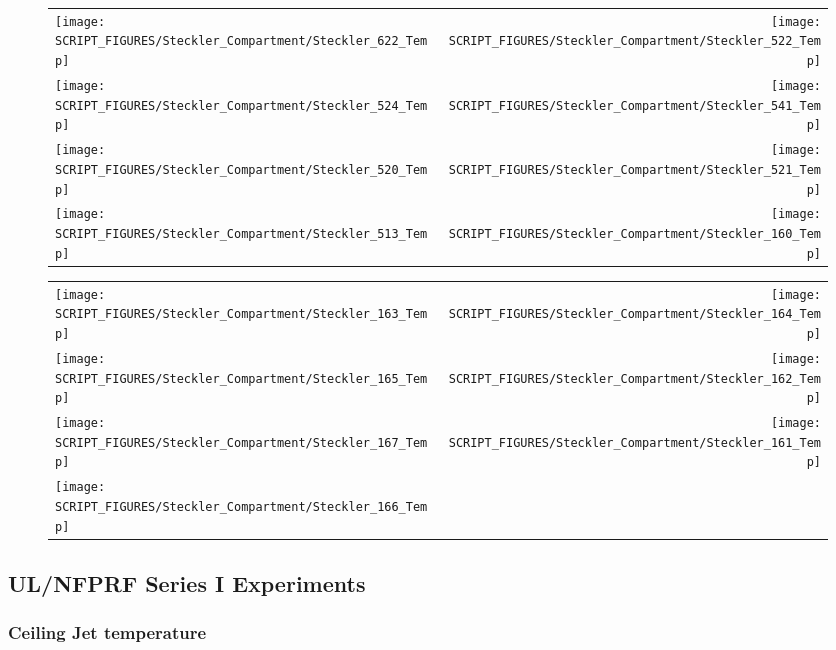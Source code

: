 \begin{figure}[!ht]
\begin{tabular*}{\textwidth}{l@{\extracolsep{\fill}}r}
\texttt{[image: SCRIPT\_FIGURES/Steckler\_Compartment/Steckler\_622\_Temp]} &
\texttt{[image: SCRIPT\_FIGURES/Steckler\_Compartment/Steckler\_522\_Temp]} \\
 \texttt{[image: SCRIPT\_FIGURES/Steckler\_Compartment/Steckler\_524\_Temp]} &
\texttt{[image: SCRIPT\_FIGURES/Steckler\_Compartment/Steckler\_541\_Temp]} \\
\texttt{[image: SCRIPT\_FIGURES/Steckler\_Compartment/Steckler\_520\_Temp]} &
\texttt{[image: SCRIPT\_FIGURES/Steckler\_Compartment/Steckler\_521\_Temp]} \\
\texttt{[image: SCRIPT\_FIGURES/Steckler\_Compartment/Steckler\_513\_Temp]} &
\texttt{[image: SCRIPT\_FIGURES/Steckler\_Compartment/Steckler\_160\_Temp]}
\end{tabular*}
\label{Steckler_Temp_6}
\end{figure}

\begin{figure}[!ht]
\begin{tabular*}{\textwidth}{l@{\extracolsep{\fill}}r}
\texttt{[image: SCRIPT\_FIGURES/Steckler\_Compartment/Steckler\_163\_Temp]} &
\texttt{[image: SCRIPT\_FIGURES/Steckler\_Compartment/Steckler\_164\_Temp]} \\
\texttt{[image: SCRIPT\_FIGURES/Steckler\_Compartment/Steckler\_165\_Temp]} &
\texttt{[image: SCRIPT\_FIGURES/Steckler\_Compartment/Steckler\_162\_Temp]} \\
\texttt{[image: SCRIPT\_FIGURES/Steckler\_Compartment/Steckler\_167\_Temp]} &
\texttt{[image: SCRIPT\_FIGURES/Steckler\_Compartment/Steckler\_161\_Temp]} \\
\texttt{[image: SCRIPT\_FIGURES/Steckler\_Compartment/Steckler\_166\_Temp]} &
\end{tabular*}
\label{Steckler_Temp_7}
\end{figure}

\clearpage

\subsection{UL/NFPRF Series I Experiments}

\subsubsection{Ceiling Jet temperature}

